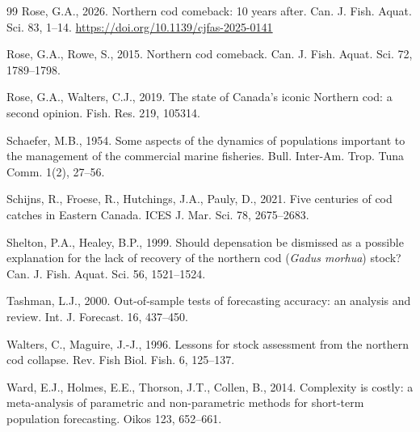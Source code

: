\begin{thebibliography}{99}
Rose, G.A., 2026. Northern cod comeback: 10 years after. Can. J. Fish. Aquat. Sci. 83, 1--14. \url{https://doi.org/10.1139/cjfas-2025-0141}

Rose, G.A., Rowe, S., 2015. Northern cod comeback. Can. J. Fish. Aquat. Sci. 72, 1789--1798.

Rose, G.A., Walters, C.J., 2019. The state of Canada's iconic Northern cod: a second opinion. Fish. Res. 219, 105314.

Schaefer, M.B., 1954. Some aspects of the dynamics of populations important to the management of the commercial marine fisheries. Bull. Inter-Am. Trop. Tuna Comm. 1(2), 27--56.

Schijns, R., Froese, R., Hutchings, J.A., Pauly, D., 2021. Five centuries of cod catches in Eastern Canada. ICES J. Mar. Sci. 78, 2675--2683.

Shelton, P.A., Healey, B.P., 1999. Should depensation be dismissed as a possible explanation for the lack of recovery of the northern cod (\emph{Gadus morhua}) stock? Can. J. Fish. Aquat. Sci. 56, 1521--1524.

Tashman, L.J., 2000. Out-of-sample tests of forecasting accuracy: an analysis and review. Int. J. Forecast. 16, 437--450.

Walters, C., Maguire, J.-J., 1996. Lessons for stock assessment from the northern cod collapse. Rev. Fish Biol. Fish. 6, 125--137.

Ward, E.J., Holmes, E.E., Thorson, J.T., Collen, B., 2014. Complexity is costly: a meta-analysis of parametric and non-parametric methods for short-term population forecasting. Oikos 123, 652--661.

\end{thebibliography}



